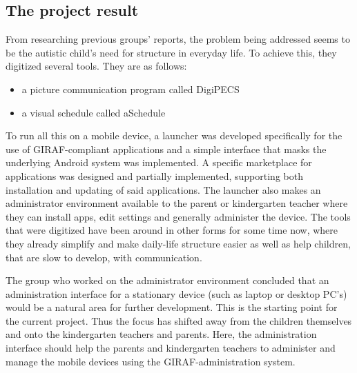 \subsection{The project result}
From researching previous groups' reports, the problem being addressed seems to be the autistic child's need for structure in everyday life. To achieve this, they digitized several tools. They are as follows:
\begin{itemize}
	\item a picture communication program called DigiPECS
	\item a visual schedule called aSchedule
\end{itemize}

To run all this on a mobile device, a launcher was developed specifically for the use of GIRAF-compliant applications and a simple interface that masks the underlying Android system was implemented. A specific marketplace for applications was designed and partially implemented, supporting both installation and updating of said applications. The launcher also makes an administrator environment available to the parent or kindergarten teacher where they can install apps, edit settings and generally administer the device.
The tools that were digitized have been around in other forms for some time now, where they already simplify and make daily-life structure easier as well as help children, that are slow to develop, with communication.

The group who worked on the administrator environment concluded that an administration interface for a stationary device (such as laptop or desktop PC's) would be a natural area for further development. This is the starting point for the current project.
Thus the focus has shifted away from the children themselves and onto the kindergarten teachers and parents. Here, the administration interface should help the parents and kindergarten teachers to administer and manage the mobile devices using the GIRAF-administration system.\cite{giraffactors}
